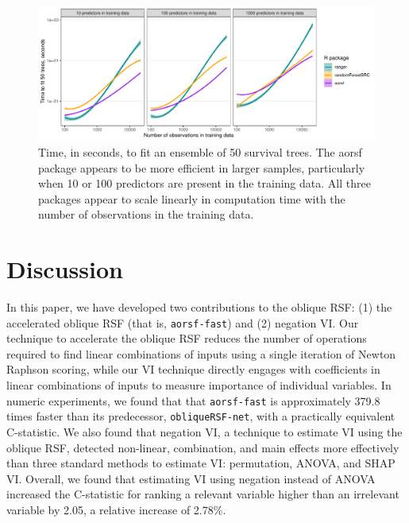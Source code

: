 \documentclass[twoside,11pt]{article}\usepackage[]{graphicx}\usepackage[]{xcolor}
\makeatletter
\def\maxwidth{ %
  \ifdim\Gin@nat@width>\linewidth
    \linewidth
  \else
    \Gin@nat@width
  \fi
}
\newenvironment{knitrout}{}{} %
\newcommand{\ie}{that is}
\makeatother
\begin{document}
\begin{knitrout}
\color{fgcolor}\begin{figure}
\includegraphics[width=\maxwidth]{figure/bm_time_viz-1} \caption[Time, in seconds, to fit an ensemble of 50 survival trees]{Time, in seconds, to fit an ensemble of 50 survival trees. The aorsf package appears to be more efficient in larger samples, particularly when 10 or 100 predictors are present in the training data. All three packages appear to scale linearly in computation time with the number of observations in the training data.}\label{fig:bm_time_viz}
\end{figure}

\end{knitrout}




\section{Discussion} \label{sec:discussion}

In this paper, we have developed two contributions to the oblique RSF: (1) the accelerated oblique RSF (\ie, \texttt{aorsf-fast}) and (2) negation VI. Our technique to accelerate the oblique RSF reduces the number of operations required to find linear combinations of inputs using a single iteration of Newton Raphson scoring, while our VI technique directly engages with coefficients in linear combinations of inputs to measure importance of individual variables. In numeric experiments, we found that that \texttt{aorsf-fast} is approximately 379.8 times faster than its predecessor, \texttt{obliqueRSF-net}, with a practically equivalent C-statistic. We also found that negation VI, a technique to estimate VI using the oblique RSF, detected non-linear, combination, and main effects more effectively than three standard methods to estimate VI: permutation, ANOVA, and SHAP VI. Overall, we found that estimating VI using negation instead of ANOVA increased the C-statistic for ranking a relevant variable higher than an irrelevant variable by 2.05, a relative increase of 2.78\%.
\end{document}
